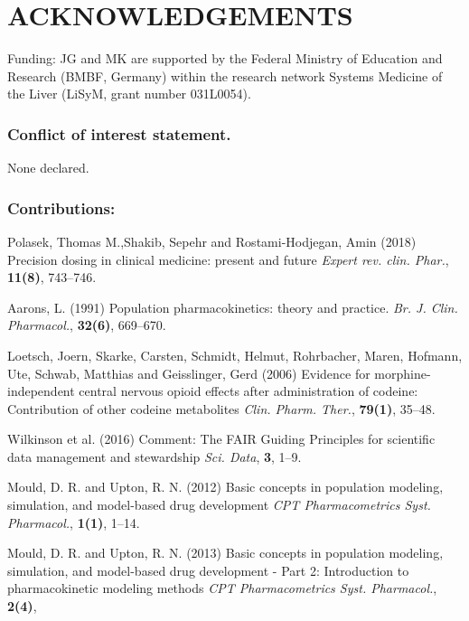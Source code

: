 \documentclass[a4,center,fleqn]{NAR}
\begin{document}
\section{ACKNOWLEDGEMENTS}
Funding: JG and MK are supported by the Federal Ministry of Education and Research (BMBF, Germany) within the research network Systems Medicine of the Liver (LiSyM, grant number 031L0054).

\subsubsection{Conflict of interest statement.} None declared.
\subsubsection{Contributions:}
\newpage
\begin{thebibliography}{4}

Polasek, Thomas M.,Shakib, Sepehr and Rostami-Hodjegan, Amin  (2018)
Precision dosing in clinical medicine: present and future
\textit{ Expert rev. clin. Phar.}, \textbf{11(8)}, 743--746.

Aarons, L. (1991)
Population pharmacokinetics: theory and practice.
\textit{Br. J. Clin. Pharmacol.}, \textbf{32(6)}, 669--670.

Loetsch, Joern, Skarke, Carsten, Schmidt, Helmut, Rohrbacher, Maren, Hofmann, Ute, Schwab, Matthias and Geisslinger, Gerd  (2006)
Evidence for morphine-independent central nervous opioid effects after administration of codeine: Contribution of other codeine metabolites
\textit{Clin. Pharm. Ther.}, \textbf{79(1)}, 35--48.

Wilkinson et al. (2016)
Comment: The FAIR Guiding Principles for scientific data management and stewardship
\textit{  Sci. Data}, \textbf{3}, 1--9.%

Mould, D. R. and Upton, R. N. (2012)
Basic concepts in population modeling, simulation, and model-based drug development
\textit{ CPT Pharmacometrics Syst. Pharmacol.}, \textbf{1(1)}, 1--14.

Mould, D. R. and Upton, R. N. (2013)
Basic concepts in population modeling, simulation, and model-based drug development - Part 2: Introduction to pharmacokinetic modeling methods
\textit{ CPT Pharmacometrics Syst. Pharmacol.}, \textbf{2(4)},


\end{thebibliography}
\end{document}
